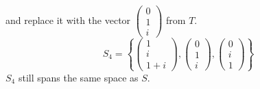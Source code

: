 \documentclass{article}
\begin{document}
\) and replace it with the vector \(
   \begin{pmatrix}
      0 \\
      1 \\
      i
   \end{pmatrix}
\) from \(T\).
\[
   S_4 = \left\{
      \begin{pmatrix}
         1 \\
         i \\
         1 + i
      \end{pmatrix},
      \begin{pmatrix}
         0 \\
         1 \\
         i
      \end{pmatrix},
      \begin{pmatrix}
         0 \\
         i \\
         1
      \end{pmatrix}
   \right\}
\]
\(S_4\) still spans the same space as \(S\).
\end{document}
